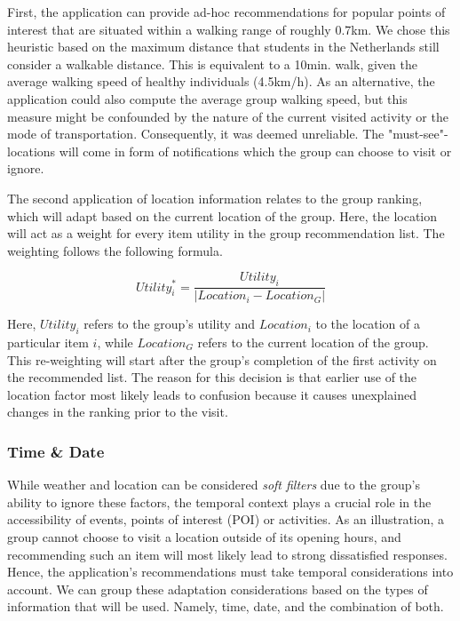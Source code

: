 \documentclass[11pt,a4paper,oneside]{article}
\begin{document}
First, the application can provide ad-hoc recommendations for popular points of interest that are situated within a walking range of roughly 0.7km. We chose this heuristic based on the maximum distance that students in the Netherlands still consider a walkable distance.\cite{ton_CyclingWalkingDeterminants_2019} This is equivalent to a 10min. walk, given the average walking speed of healthy individuals (4.5km/h).\cite{schimpl_AssociationWalkingSpeed_2011} As an alternative, the application could also compute the average group walking speed, but this measure might be confounded by the nature of the current visited activity or the mode of transportation. Consequently, it was deemed unreliable. The "must-see"-locations will come in form of notifications which the group can choose to visit or ignore. 

The second application of location information relates to the group ranking, which will adapt based on the current location of the group. Here, the location will act as a weight for every item utility in the group recommendation list. The weighting follows the following formula.

\begin{equation}
    Utility_{i}^* = \frac{Utility_i}{\lvert Location_i - Location_G \rvert}
\end{equation}

Here, $Utility_i$ refers to the group's utility and $Location_i$ to the location of a particular item $i$, while $Location_G$ refers to the current location of the group. This re-weighting will start after the group's completion of the first activity on the recommended list. The reason for this decision is that earlier use of the location factor most likely leads to confusion because it causes unexplained changes in the ranking prior to the visit. 


\subsubsection{Time \& Date}
While weather and location can be considered \emph{soft filters} due to the group's ability to ignore these factors, the temporal context plays a crucial role in the accessibility of events, points of interest (POI) or activities. As an illustration, a group cannot choose to visit a location outside of its opening hours, and recommending such an item will most likely lead to strong dissatisfied responses. Hence, the application's recommendations must take temporal considerations into account. We can group these adaptation considerations based on the types of information that will be used. Namely, time, date, and the combination of both. 
\end{document}
